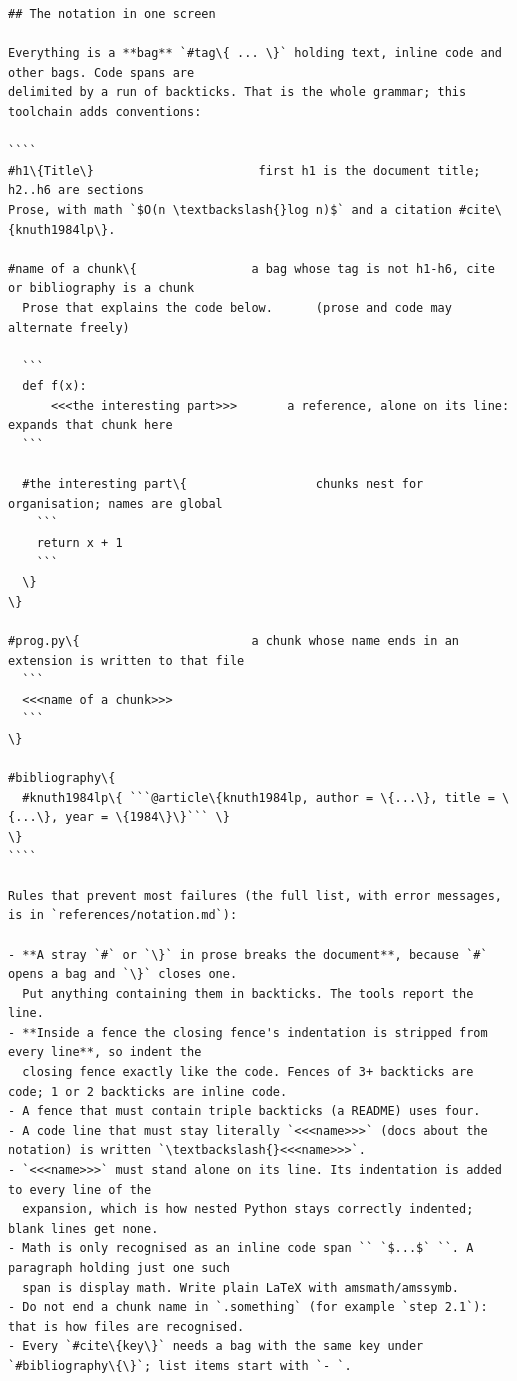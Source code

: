 \documentclass[10pt,a4paper]{article}
\newcounter{chunk}
\begin{document}
\begin{Verbatim}
## The notation in one screen

Everything is a **bag** `#tag\{ ... \}` holding text, inline code and other bags. Code spans are
delimited by a run of backticks. That is the whole grammar; this toolchain adds conventions:

````
#h1\{Title\}                       first h1 is the document title; h2..h6 are sections
Prose, with math `$O(n \textbackslash{}log n)$` and a citation #cite\{knuth1984lp\}.

#name of a chunk\{                a bag whose tag is not h1-h6, cite or bibliography is a chunk
  Prose that explains the code below.      (prose and code may alternate freely)

  ```
  def f(x):
      <<<the interesting part>>>       a reference, alone on its line: expands that chunk here
  ```

  #the interesting part\{                  chunks nest for organisation; names are global
    ```
    return x + 1
    ```
  \}
\}

#prog.py\{                        a chunk whose name ends in an extension is written to that file
  ```
  <<<name of a chunk>>>
  ```
\}

#bibliography\{
  #knuth1984lp\{ ```@article\{knuth1984lp, author = \{...\}, title = \{...\}, year = \{1984\}\}``` \}
\}
````

Rules that prevent most failures (the full list, with error messages, is in `references/notation.md`):

- **A stray `#` or `\}` in prose breaks the document**, because `#` opens a bag and `\}` closes one.
  Put anything containing them in backticks. The tools report the line.
- **Inside a fence the closing fence's indentation is stripped from every line**, so indent the
  closing fence exactly like the code. Fences of 3+ backticks are code; 1 or 2 backticks are inline code.
- A fence that must contain triple backticks (a README) uses four.
- A code line that must stay literally `<<<name>>>` (docs about the notation) is written `\textbackslash{}<<<name>>>`.
- `<<<name>>>` must stand alone on its line. Its indentation is added to every line of the
  expansion, which is how nested Python stays correctly indented; blank lines get none.
- Math is only recognised as an inline code span `` `$...$` ``. A paragraph holding just one such
  span is display math. Write plain LaTeX with amsmath/amssymb.
- Do not end a chunk name in `.something` (for example `step 2.1`): that is how files are recognised.
- Every `#cite\{key\}` needs a bag with the same key under `#bibliography\{\}`; list items start with `- `.


\end{Verbatim}
\end{document}
